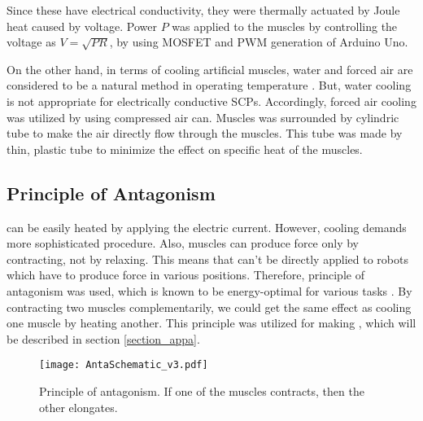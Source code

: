 Since these \scps have electrical conductivity, they were thermally actuated by Joule heat caused by voltage.
Power $ P $ was applied to the muscles by controlling the voltage as $ V=\sqrt{PR} $, by using MOSFET and PWM generation of Arduino Uno.

On the other hand, in terms of cooling artificial muscles, water and forced air are considered to be a natural method in operating temperature \cite{madden}.
But, water cooling is not appropriate for electrically conductive SCPs. Accordingly, forced air cooling was utilized by using compressed air can.
Muscles was surrounded by cylindric tube to make the air directly flow through the muscles.
This tube was made by thin, plastic tube to minimize the effect on specific heat of the muscles.


\subsection{Principle of Antagonism} \label{subsection_anta}
\scps can be easily heated by applying the electric current. However, cooling demands more sophisticated procedure. Also, muscles can produce force only by contracting, not by relaxing. This means that \scps can't be directly applied to robots which have to produce force in various positions.
Therefore, principle of antagonism was used, which is known to be energy-optimal for various tasks \cite{antagonism}. 
By contracting two muscles complementarily, we could get the same effect as cooling one muscle by heating another. 
This principle was utilized for making \antanospace, which will be described in section \ref{section_appa}.

\begin{figure}[b]
	\centering
	\texttt{[image: AntaSchematic\_v3.pdf]}
	\caption[Principle of Antagonism.]{Principle of antagonism. If one of the muscles contracts, then the other elongates.}
	\label{antagonism}
\end{figure}


